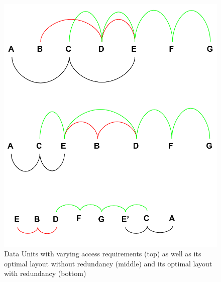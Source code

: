 \begin{figure}[ht]
\centering
\includegraphics[width=\columnwidth]{examplePic.png}
\caption{Data Units with varying access requirements (top) as well as its optimal layout without redundancy (middle) and its optimal layout with redundancy (bottom)}
\label{fig:startingProb}
\end{figure}

